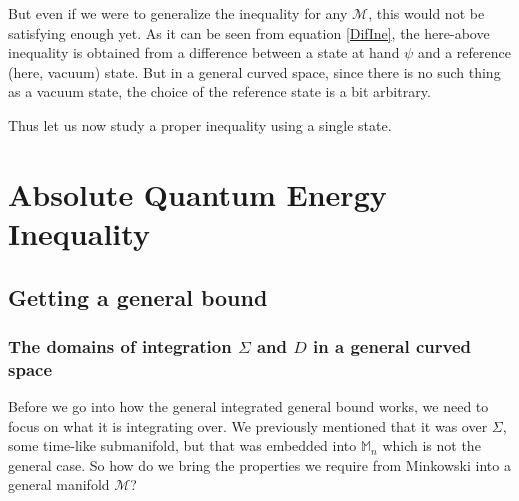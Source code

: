 \documentclass[a4paper,11pt]{article}
\numberwithin{equation}{section}
\theoremstyle{definition}
\begin{document}
But even if we were to generalize the inequality for any $\mathcal{M}$, this would not be satisfying enough yet. As it can be seen from equation \ref{DifIne}, the here-above inequality is obtained from a difference between a state at hand $\psi$ and a reference (here, vacuum) state. But in a general curved space, since there is no such thing as a vacuum state, the choice of the reference state is a bit arbitrary. 

\noindent Thus let us now study a proper inequality using a single state.

\section{Absolute Quantum Energy Inequality}
\subsection{Getting a general bound}
\subsubsection{The domains of integration $\Sigma$ and $D$ in a general curved space}
Before we go into how the general integrated general bound works, we need to focus on what it is integrating over. We previously mentioned that it was over $\Sigma$, some time-like submanifold, but that was embedded into $\mathbb{M}_n$ which is not the general case. So how do we bring the properties we require from Minkowski into a general manifold $\mathcal{M}$?
\end{document}
